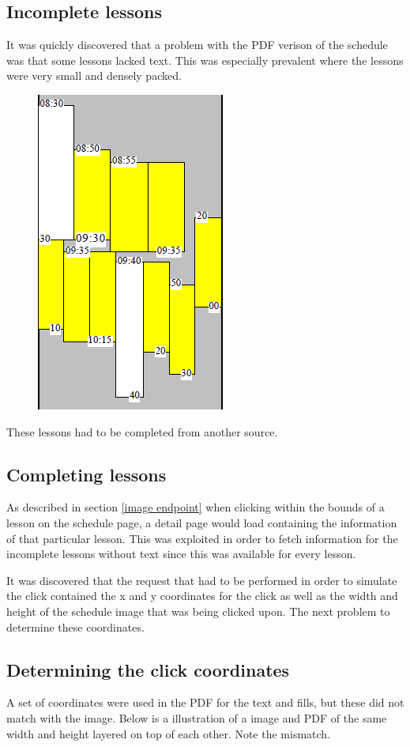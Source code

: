 \documentclass{article}
\begin{document}
	\subsection{Incomplete lessons}
	It was quickly discovered that a problem with the PDF verison of the schedule was that some lessons lacked text. This was especially prevalent where the lessons were very small and densely packed.
	
	\begin{figure}[h]
		\centering
		\includegraphics[width=0.3\linewidth]{images/pdf-no-text}
		\caption{}
		\label{fig:pdf-no-text}
	\end{figure}
	
	These lessons had to be completed from another source.
	
	\subsection{Completing lessons}
	As described in section \ref{image endpoint} when clicking within the bounds of a lesson on the schedule page, a detail page would load containing the information of that particular lesson. This was exploited in order to fetch information for the incomplete lessons without text since this was available for every lesson.
	
	It was discovered that the request that had to be performed in order to simulate the click contained the x and y coordinates for the click as well as the width and height of the schedule image that was being clicked upon. The next problem to determine these coordinates.
	
	\subsection{Determining the click coordinates}
	A set of coordinates were used in the PDF for the text and fills, but these did not match with the image. Below is a illustration of a image and PDF of the same width and height layered on top of each other. Note the mismatch.
	
\end{document}
